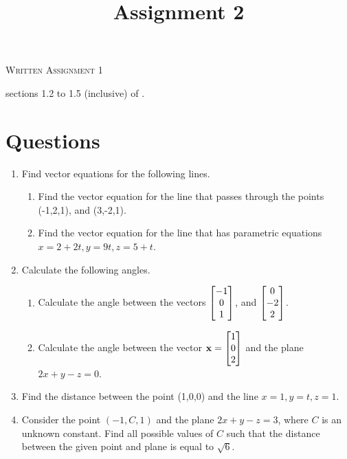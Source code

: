 \documentclass{article}
\title{Assignment 2}
\date{}
\begin{document}
\begin{center}
\textsc{\LARGE Written Assignment 1}\\[0.5cm]
\end{center}
\From sections 1.2 to 1.5 (inclusive) of \VCT.

\section*{Questions}

\begin{enumerate}

\item 
Find vector equations for the following lines.
\begin{enumerate}
\item Find the vector equation for the line that passes through the points (-1,2,1), and (3,-2,1).
\item Find the vector equation for the line that has parametric equations $x=2+2t, y=9t, z=5+t$.
\end{enumerate}
\item 
Calculate the following angles.
\begin{enumerate}
\item Calculate the angle between the vectors $\begin{bmatrix} -1\\ 0 \\ 1 \end{bmatrix}$, and $\begin{bmatrix} 0 \\ -2 \\ 2 \end{bmatrix}$.
\item Calculate the angle between the vector $\mathbf{x}=\begin{bmatrix} 1 \\ 0 \\ 2 \end{bmatrix}$ and the plane $2x+y-z=0$.
\end{enumerate}
\item 
Find the distance between the point (1,0,0) and the line $x=1, y=t, z=1$.
\item 
Consider the point $(-1,C,1)$ and the plane $2x+y-z=3$, where $C$ is an unknown constant. Find all possible values of $C$ such that the distance between the given point and plane is equal to $\sqrt{6}$. 

\end{enumerate}
\end{document}
